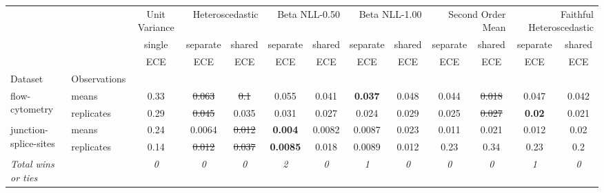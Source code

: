 \begin{tabular}{ll|c|cc|cc|cc|cc|cc}
\toprule
{} & {} & {Unit Variance} & \multicolumn{2}{r}{Heteroscedastic} & \multicolumn{2}{r}{Beta NLL-0.50} & \multicolumn{2}{r}{Beta NLL-1.00} & \multicolumn{2}{r}{Second Order Mean} & \multicolumn{2}{r}{Faithful Heteroscedastic} \\
{} & {} & {single} & {separate} & {shared} & {separate} & {shared} & {separate} & {shared} & {separate} & {shared} & {separate} & {shared} \\
{} & {} & {ECE} & {ECE} & {ECE} & {ECE} & {ECE} & {ECE} & {ECE} & {ECE} & {ECE} & {ECE} & {ECE} \\
{Dataset} & {Observations} & {} & {} & {} & {} & {} & {} & {} & {} & {} & {} & {} \\
\midrule
\multirow[t]{2}{*}{flow-cytometry} & means & 0.33 & \sout{0.063} & \sout{0.1} & 0.055 & 0.041 & \textbf{0.037} & 0.048 & 0.044 & \sout{0.018} & 0.047 & 0.042 \\
 & replicates & 0.29 & \sout{0.045} & 0.035 & 0.031 & 0.027 & 0.024 & 0.029 & 0.025 & \sout{0.027} & \textbf{0.02} & 0.021 \\
\multirow[t]{2}{*}{junction-splice-sites} & means & 0.24 & 0.0064 & \sout{0.012} & \textbf{0.004} & 0.0082 & 0.0087 & 0.023 & 0.011 & 0.021 & 0.012 & 0.02 \\
 & replicates & 0.14 & \sout{0.012} & \sout{0.037} & \textbf{0.0085} & 0.018 & 0.0089 & 0.012 & 0.23 & 0.34 & 0.23 & 0.2 \\
\textit{{Total wins or ties}} &  & \textit{0} & \textit{0} & \textit{0} & \textit{2} & \textit{0} & \textit{1} & \textit{0} & \textit{0} & \textit{0} & \textit{1} & \textit{0} \\
\bottomrule
\end{tabular}
